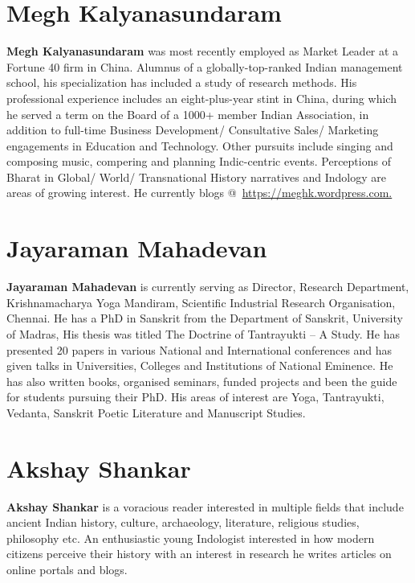 \section*{Megh Kalyanasundaram}

\textbf{Megh Kalyanasundaram} was most recently employed as Market Leader at a Fortune 40 firm in China. Alumnus of a globally-top-ranked Indian management school, his specialization has included a study of research methods. His professional experience includes an eight-plus-year stint in China, during which he served a term on the Board of a 1000+ member Indian Association, in addition to full-time Business Development/ Consultative Sales/ Marketing engagements in Education and Technology. Other pursuits include singing and composing music, compering and planning Indic-centric events. Perceptions of Bharat in Global/ World/ Transnational History narratives and Indology are areas of growing interest. He currently blogs @ \url{https://meghk.wordpress.com.}

\section*{Jayaraman Mahadevan}

\textbf{Jayaraman Mahadevan} is currently serving as Director, Research Department, Krishnamacharya Yoga Mandiram, Scientific Industrial Research Organisation, Chennai. He has a PhD in Sanskrit from the Department of Sanskrit, University of Madras, His thesis was titled The Doctrine of Tantrayukti – A Study. He has presented 20 papers in various National and International conferences and has given talks in Universities, Colleges and Institutions of National Eminence. He has also written books, organised seminars, funded projects and been the guide for students pursuing their PhD. His areas of interest are Yoga, Tantrayukti, Vedanta, Sanskrit Poetic Literature and Manuscript Studies.

\section*{Akshay Shankar}

\vskip -2pt

\textbf{Akshay Shankar} is a voracious reader interested in multiple fields that include ancient Indian history, culture, archaeology, literature, religious studies, philosophy etc. An enthusiastic young Indologist interested in how modern citizens perceive their history with an interest in research he writes articles on online portals and blogs.

